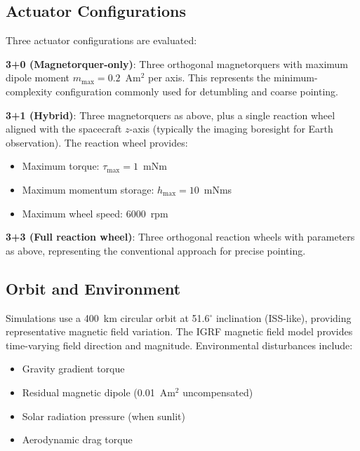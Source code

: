 \documentclass[9pt]{extarticle}
\begin{document}
\subsection{Actuator Configurations}

Three actuator configurations are evaluated:

\textbf{3+0 (Magnetorquer-only)}: Three orthogonal magnetorquers with maximum dipole moment $m_{\max} = 0.2$~Am$^2$ per axis. This represents the minimum-complexity configuration commonly used for detumbling and coarse pointing.

\textbf{3+1 (Hybrid)}: Three magnetorquers as above, plus a single reaction wheel aligned with the spacecraft $z$-axis (typically the imaging boresight for Earth observation). The reaction wheel provides:
\begin{itemize}
    \item Maximum torque: $\tau_{\max} = 1$~mNm
    \item Maximum momentum storage: $h_{\max} = 10$~mNms
    \item Maximum wheel speed: 6000~rpm
\end{itemize}

\textbf{3+3 (Full reaction wheel)}: Three orthogonal reaction wheels with parameters as above, representing the conventional approach for precise pointing.


\subsection{Orbit and Environment}

Simulations use a 400~km circular orbit at 51.6$^\circ$ inclination (ISS-like), providing representative magnetic field variation. The IGRF magnetic field model provides time-varying field direction and magnitude. Environmental disturbances include:

\begin{itemize}
    \item Gravity gradient torque
    \item Residual magnetic dipole (0.01~Am$^2$ uncompensated)
    \item Solar radiation pressure (when sunlit)
    \item Aerodynamic drag torque
\end{itemize}

\end{document}

